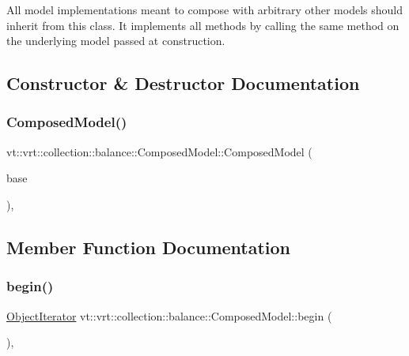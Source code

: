 All model implementations meant to compose with arbitrary other models should inherit from this class. It implements all methods by calling the same method on the underlying model passed at construction. 

\subsection{Constructor \& Destructor Documentation}
\mbox{\label{classvt_1_1vrt_1_1collection_1_1balance_1_1_composed_model_a84b77c1fceb9e07a0706b896a4d9e9c9}} 
\subsubsection{\texorpdfstring{Composed\+Model()}{ComposedModel()}}
{\footnotesize\ttfamily vt\+::vrt\+::collection\+::balance\+::\+Composed\+Model\+::\+Composed\+Model (\begin{DoxyParamCaption}\item[{std\+::shared\+\_\+ptr$<$ \hyperlink{classvt_1_1vrt_1_1collection_1_1balance_1_1_load_model}{Load\+Model} $>$}]{base }\end{DoxyParamCaption})\hspace{0.3cm}{\ttfamily [inline]}, {\ttfamily [explicit]}}



\subsection{Member Function Documentation}
\mbox{\label{classvt_1_1vrt_1_1collection_1_1balance_1_1_composed_model_a8f34205887c08a22a1e5bef6ee358f2b}} 
\subsubsection{\texorpdfstring{begin()}{begin()}}
{\footnotesize\ttfamily \hyperlink{classvt_1_1vrt_1_1collection_1_1balance_1_1_object_iterator}{Object\+Iterator} vt\+::vrt\+::collection\+::balance\+::\+Composed\+Model\+::begin (\begin{DoxyParamCaption}{ }\end{DoxyParamCaption})\hspace{0.3cm}{\ttfamily [override]}, {\ttfamily [virtual]}}


